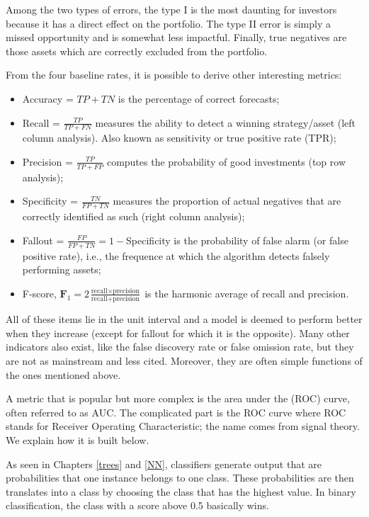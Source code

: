 \documentclass[]{krantz}
\providecommand{\tightlist}{%
  \setlength{\itemsep}{0pt}\setlength{\parskip}{0pt}}
\theoremstyle{definition}
\theoremstyle{definition}
\theoremstyle{definition}
\theoremstyle{remark}
\begin{document}
Among the two types of errors, the type I is the most daunting for
investors because it has a direct effect on the portfolio. The type II
error is simply a missed opportunity and is somewhat less impactful.
Finally, true negatives are those assets which are correctly excluded
from the portfolio.

From the four baseline rates, it is possible to derive other interesting
metrics:

\begin{itemize}
\tightlist
\item
  Accuracy = \(TP+TN\) is the percentage of correct forecasts;\\
\item
  Recall = \(\frac{TP}{TP+FN}\) measures the ability to detect a winning
  strategy/asset (left column analysis). Also known as sensitivity or
  true positive rate (TPR);
\item
  Precision = \(\frac{TP}{TP+FP}\) computes the probability of good
  investments (top row analysis);
\item
  Specificity = \(\frac{TN}{FP+TN}\) measures the proportion of actual
  negatives that are correctly identified as such (right column
  analysis);
\item
  Fallout = \(\frac{FP}{FP+TN}=1-\)Specificity is the probability of
  false alarm (or false positive rate), i.e., the frequence at which the
  algorithm detects falsely performing assets;\\
\item
  F-score,
  \(\mathbf{F}_1=2\frac{\text{recall}\times \text{precision}}{\text{recall}+ \text{precision}}\)
  is the harmonic average of recall and precision.
\end{itemize}

All of these items lie in the unit interval and a model is deemed to
perform better when they increase (except for fallout for which it is
the opposite). Many other indicators also exist, like the false
discovery rate or false omission rate, but they are not as mainstream
and less cited. Moreover, they are often simple functions of the ones
mentioned above.

A metric that is popular but more complex is the area under the (ROC)
curve, often referred to as AUC. The complicated part is the ROC curve
where ROC stands for Receiver Operating Characteristic; the name comes
from signal theory. We explain how it is built below.

As seen in Chapters \ref{trees} and \ref{NN}, classifiers generate
output that are probabilities that one instance belongs to one class.
These probabilities are then translates into a class by choosing the
class that has the highest value. In binary classification, the class
with a score above 0.5 basically wins.
\end{document}
